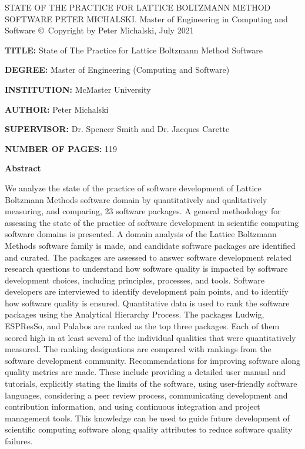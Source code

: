 \documentclass[12pt, notitlepage]{article}
\newcommand{\fulltitle}{State of the Practice for Lattice Boltzmann Method Software}
\newcommand{\authorname}{Peter Michalski}
\begin{document}
\begin{singlespace}

\thesistitle
	{\MakeUppercase{\fulltitle}}
	{\MakeUppercase{\authorname}.}
	{Master of Engineering in Computing and Software}
	{\copyright \ Copyright by \authorname, July 2021}

\newpage
\thispagestyle{empty}

\noindent\textbf{TITLE:} State of The Practice for Lattice Boltzmann Method Software

\noindent\textbf{DEGREE:} Master of Engineering (Computing and Software)

\noindent\textbf{INSTITUTION:} McMaster University

\noindent\textbf{AUTHOR:} Peter Michalski

\noindent\textbf{SUPERVISOR:} Dr. Spencer Smith and Dr. Jacques Carette

\noindent\textbf{NUMBER OF PAGES:} 119


\newpage
\thispagestyle{empty}
\begin{center}
	\textbf{\large Abstract}
\end{center}

We analyze the state of the practice of software development of Lattice Boltzmann Methods software domain by quantitatively and qualitatively measuring, and comparing, 23 software packages. A general methodology for assessing the state of the practice of software development in scientific computing software domains is presented. A domain analysis of the Lattice Boltzmann Methods software family is made, and candidate software packages are identified and curated. The packages are assessed to answer software development related research questions to understand how software quality is impacted by software development choices, including principles, processes, and tools. Software developers are interviewed to identify development pain points, and to identify how software quality is ensured. Quantitative data is used to rank the software packages using the Analytical Hierarchy Process. The packages Ludwig, ESPResSo, and Palabos are ranked as the top three packages. Each of them scored high in at least several of the individual qualities that were quantitatively measured. The ranking designations are compared with rankings from the software development community. Recommendations for improving software along quality metrics are made. These include providing a detailed user manual and tutorials, explicitly stating the limits of the software, using user-friendly software languages, considering a peer review process, communicating development and contribution information, and using continuous integration and project management tools. This knowledge can be used to guide future development of scientific computing software along quality attributes to reduce software quality failures.\\ 


\end{singlespace}
\end{document}
